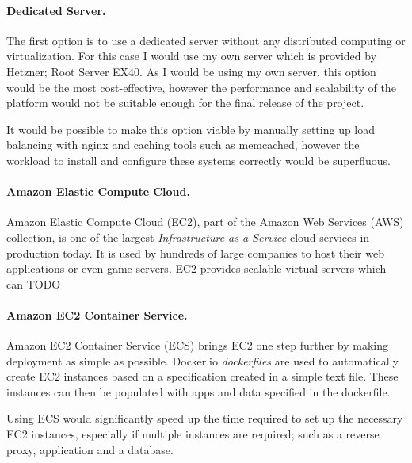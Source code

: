 \documentclass[a4paper, 12pt]{article}
\begin{document}

\paragraph{Dedicated Server.}
The first option is to use a dedicated server without any distributed computing or virtualization. For this case I would use my own server which is provided by Hetzner; Root Server EX40. As I would be using my own server, this option would be the most cost-effective, however the performance and scalability of the platform would not be suitable enough for the final release of the project.


It would be possible to make this option viable by manually setting up load balancing with nginx and caching tools such as memcached, however the workload to install and configure these systems correctly would be superfluous.


\paragraph{Amazon Elastic Compute Cloud.}
Amazon Elastic Compute Cloud (EC2), part of the Amazon Web Services (AWS) collection, is one of the largest \emph{Infrastructure as a Service} cloud services in production today. It is used by hundreds of large companies to host their web applications or even game servers. EC2 provides scalable virtual servers which can TODO


\paragraph{Amazon EC2 Container Service.}
Amazon EC2 Container Service (ECS) brings EC2 one step further by making deployment as simple as possible. Docker.io \emph{dockerfiles} are used to automatically create EC2 instances based on a specification created in a simple text file. These instances can then be populated with apps and data specified in the dockerfile.


Using ECS would significantly speed up the time required to set up the necessary EC2 instances, especially if multiple instances are required; such as a reverse proxy, application and a database.
\end{document}
